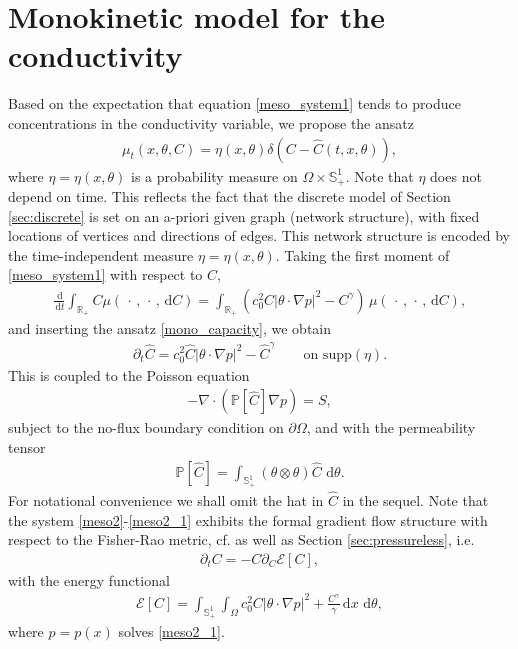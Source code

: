 \documentclass{article}
\numberwithin{equation}{section}
\def\[{\begin{eqnarray*}}
\def\]{\end{eqnarray*}}
\def\d{\,\mathrm{d}}
\begin{document}
\section{Monokinetic model for the conductivity}\label{sec:monokinetic}
Based on the expectation that equation \eqref{meso_system1} tends to produce concentrations in the conductivity variable,
we propose the ansatz
\begin{align}\label{mono_capacity}
   \mu_t(x,\theta,C) = \eta(x,\theta) \delta(C-\hat{C}(t,x,\theta)),
\end{align}
where $\eta=\eta(x,\theta)$ is a probability measure on $\Omega\times\mathbb{S}^1_+$.
Note that $\eta$ does not depend on time. This reflects the fact that the discrete model of Section \ref{sec:discrete}
is set on an a-priori given graph (network structure), with fixed locations of vertices and directions of edges.
This network structure is encoded by the time-independent measure $\eta=\eta(x,\theta)$.
Taking the first moment of \eqref{meso_system1} with respect to $C$,
\[
   \frac{\d}{\d t} \int_\mathbb{R_+} C \mu(\,\cdot\, , \, \cdot\, , \d C)
      = \int_\mathbb{R_+}(c_0^2 C|\theta \cdot \nabla p|^2 -C^\gamma )\, \mu(\,\cdot\, , \, \cdot\, , \d C),
\]
and inserting the ansatz \eqref{mono_capacity}, we obtain
\begin{align}\label{meso2}
   \partial_t \hat{C} = c_0^2 \hat{C} |\theta\cdot \nabla p|^2 -\hat{C}^\gamma\qquad\mbox{on supp}(\eta).
\end{align}
This is coupled to the Poisson equation
\begin{align}\label{meso2_1}
   -\nabla \cdot (\mathbb{P}[\hat{C}] \nabla p) = S,
\end{align}
subject to the no-flux boundary condition on $\partial\Omega$,
and with the permeability tensor
\begin{align}\label{meso2_2}
   \mathbb{P}[\hat{C}] = \int_{\mathbb{S}_+^1}(\theta \otimes \theta) \hat{C} \, \d\theta.
\end{align}
For notational convenience we shall omit the hat in $\hat{C}$ in the sequel.
Note that the system \eqref{meso2}-\eqref{meso2_1} exhibits the formal gradient flow structure
with respect to the Fisher-Rao metric, cf. \cite{gallouet2017jko,chizat2016interpolating} as well as Section \ref{sec:pressureless}, i.e.
\[
   \partial_t C = - C \partial_C \mathcal{E}[C],
\] 
with the energy functional
\begin{align} \label{Emono}
   \mathcal{E}[C] = \int_{\mathbb{S}_+^1}\int_\Omega c_0^2 C|\theta \cdot \nabla p|^2 +\frac{C^\gamma}{\gamma} \d x \, \d\theta,
\end{align}
where $p=p(x)$ solves \eqref{meso2_1}.
\end{document}
